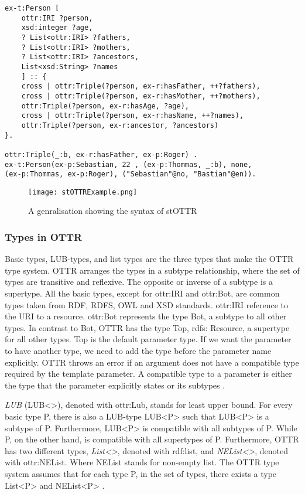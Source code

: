 \begin{lstlisting}[frame=single]
ex-t:Person [
    ottr:IRI ?person,
    xsd:integer ?age,
    ? List<ottr:IRI> ?fathers,
    ? List<ottr:IRI> ?mothers,
    ? List<ottr:IRI> ?ancestors,
    List<xsd:String> ?names
    ] :: {
    cross | ottr:Triple(?person, ex-r:hasFather, ++?fathers),
    cross | ottr:Triple(?person, ex-r:hasMother, ++?mothers),
    ottr:Triple(?person, ex-r:hasAge, ?age),
    cross | ottr:Triple(?person, ex-r:hasName, ++?names),
    ottr:Triple(?person, ex-r:ancestor, ?ancestors)
}.

ottr:Triple(_:b, ex-r:hasFather, ex-p:Roger) .
ex-t:Person(ex-p:Sebastian, 22 , (ex-p:Thommas, _:b), none, 
(ex-p:Thommas, ex-p:Roger), ("Sebastian"@no, "Bastian"@en)).
\end{lstlisting}

\begin{figure}
    \centering
    \texttt{[image: stOTTRExample.png]}
    \caption{A genralisation showing the syntax of stOTTR}
    \label{fig:stOTTERGenralisation}
\end{figure}

\subsubsection{Types in OTTR}
\label{ottr types} 
Basic types, LUB-types, and list types are the three types that make the OTTR type system. OTTR arranges the types in a subtype relationship, where the set of types are transitive and reflexive. The opposite or inverse of a subtype is a supertype. All the basic types, except for ottr:IRI and ottr:Bot, are common types taken from RDF, RDFS, OWL and XSD standards. ottr:IRI reference to the URI to a resource. ottr:Bot represents the type Bot, a subtype to all other types. In contrast to Bot, OTTR has the type Top, rdfs: Resource, a supertype for all other types.  Top is the default parameter type. If we want the parameter to have another type, we need to add the type before the parameter name explicitly. OTTR throws an error if an argument does not have a compatible type required by the template parameter.  A compatible type to a parameter is either the type that the parameter explicitly states or its subtypes \autocite[5-6]{SLKK_OTTR_2021}.

\para
\emph{LUB} (LUB<>), denoted with ottr:Lub, stands for least upper bound. For every basic type P, there is also a LUB-type LUB<P> such that LUB<P> is a subtype of P. Furthermore, LUB<P> is compatible with all subtypes of P. While P, on the other hand, is compatible with all supertypes of P. Furthermore, OTTR has two different types, \emph{List<>}, denoted with rdf:list, and \emph{NEList<>}, denoted with ottr:NEList. Where NEList stands for non-empty list. The OTTR type system assumes that for each type P, in the set of types, there exists a type List<P> and NEList<P> \autocite[5]{SLKK_OTTR_2021}.

